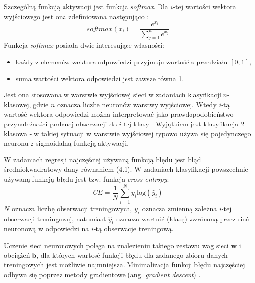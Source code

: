 \documentclass[notitlepage]{report}
\begin{document}
Szczególną funkcją aktywacji jest funkcja \textit{softmax}. Dla $i$-tej wartości wektora wyjściowego jest ona zdefiniowana następująco \cite{goodfellow}:
\begin{equation}
softmax(x_{i}) = \frac{e^{x_i}}{\sum_{j = 1}^{n}e^{x_j}}
\end{equation}
Funkcja \textit{softmax} posiada dwie interesujące własności:
\begin{itemize}
	\item każdy z elemenów wektora odpowiedzi przyjmuje wartość z przedziału $[0;1]$,
	\item suma wartości wektora odpowiedzi jest zawsze równa 1.
\end{itemize}
Jest ona stosowana w warstwie wyjściowej sieci w zadaniach klasyfikacji $n$-klasowej, gdzie $n$ oznacza liczbe neuronów warstwy wyjściowej. Wtedy $i$-tą wartość wektora odpowiedzi można interpretować jako prawdopodobieństwo przynależności podanej obserwacji do $i$-tej klasy \cite{goodfellow} \cite{nwakpa}. Wyjątkiem jest klasyfikacja 2-klasowa - w takiej sytuacji w warstwie wyjściowej typowo używa się pojedynczego neuronu z sigmoidalną funkcją aktywacji.

W zadaniach regresji najczęściej używaną funkcją błędu jest błąd średniokwadratowy dany równaniem (4.1). W zadaniach klasyfikacji powszechnie używaną funkcją błędu jest tzw. funkcja \textit{cross-entropy}:
\begin{equation}
CE = \frac{1}{N}\sum_{i=1}^{N}y_i\text{log}(\hat{y}_i)
\end{equation}
$N$ oznacza liczbę obserwacji treningowych, $y_i$ oznacza zmienną zależna $i$-tej obserwacji treningowej, natomiast $\hat{y}_i$ oznacza wartość (klasę) zwróconą przez sieć neuronową w odpowiedzi na $i$-tą obserwacje treningową.

Uczenie sieci neuronowych polega na znalezieniu takiego zestawu wag sieci $\mathbf{w}$ i obciążeń $\mathbf{b}$, dla których wartość funkcji błędu dla zadanego zbioru danych treningowych jest możliwie najmniejsza. Minimalizacja funkcji błędu najczęściej odbywa się poprzez metody gradientowe (ang. \textit{gradient descent}) \cite{goodfellow}. 
\end{document}
